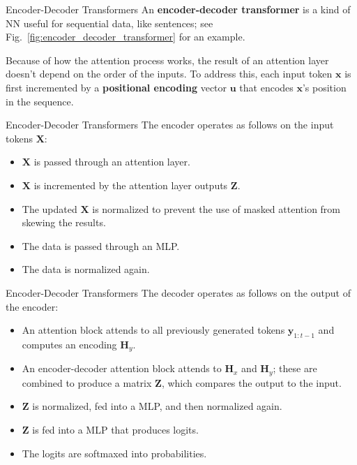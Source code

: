 \documentclass{beamer}
\begin{document}
\begin{frame}{Encoder-Decoder Transformers}
    An \textbf{encoder-decoder transformer} is a kind of NN useful for sequential data, like sentences; see Fig.~\ref{fig:encoder_decoder_transformer} for an example. 
    
    \medskip
    
    Because of how the attention process works, the result of an attention layer doesn't depend on the order of the inputs. To address this, each input token $\boldsymbol{x}$ is first incremented by a \textbf{positional encoding} vector $\boldsymbol{u}$ that encodes $\boldsymbol{x}$'s position in the sequence.
\end{frame}

\begin{frame}{Encoder-Decoder Transformers}
    The encoder operates as follows on the input tokens $\boldsymbol{X}$:
    \begin{itemize}
        \item $\boldsymbol{X}$ is passed through an attention layer.
        \item $\boldsymbol{X}$ is incremented by the attention layer outputs $\boldsymbol{Z}$.
        \item The updated $\boldsymbol{X}$ is normalized to prevent the use of masked attention from skewing the results.
        \item The data is passed through an MLP.
        \item The data is normalized again.
    \end{itemize} 
\end{frame}

\begin{frame}{Encoder-Decoder Transformers}
    The decoder operates as follows on the output of the encoder:
    \begin{itemize}
        \item An attention block attends to all previously generated tokens $\boldsymbol{y}_{1:t - 1}$ and computes an encoding $\boldsymbol{H}_y$.
        \item An encoder-decoder attention block attends to $\boldsymbol{H}_x$ and $\boldsymbol{H}_y$; these are combined to produce a matrix $\boldsymbol{Z}$, which compares the output to the input.
        \item $\boldsymbol{Z}$ is normalized, fed into a MLP, and then normalized again.
        \item $\boldsymbol{Z}$ is fed into a MLP that produces logits.
        \item The logits are softmaxed into probabilities.
    \end{itemize}
\end{frame}
\end{document}
